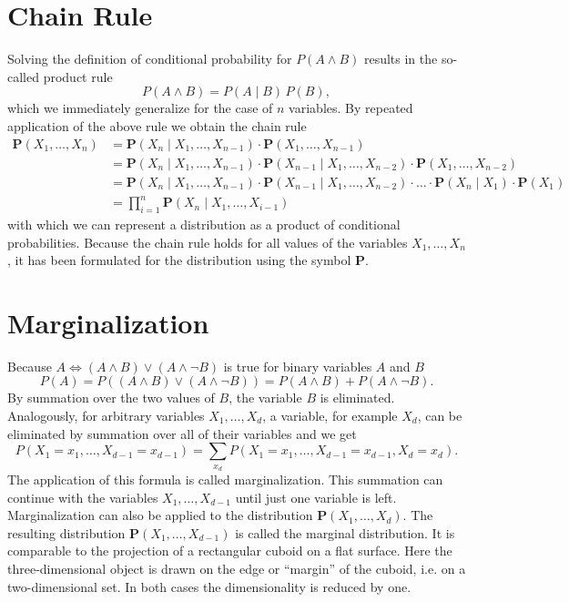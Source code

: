 \documentclass[10pt]{book}
\begin{document}
\section{Chain Rule}
Solving the definition of conditional probability for $P(A \wedge B)$ results in the so-called product rule
\[
P(A \wedge B)=P(A \mid B)\,P(B),
\]
which we immediately generalize for the case of $n$ variables. By repeated application of the above rule we obtain the chain rule
\begin{align*}
\boldsymbol{P}\left(X_{1}, \ldots, X_{n}\right)
&=\boldsymbol{P}\left(X_{n} \mid X_{1}, \ldots, X_{n-1}\right)\cdot \boldsymbol{P}\left(X_{1}, \ldots, X_{n-1}\right) \\
&=\boldsymbol{P}\left(X_{n} \mid X_{1}, \ldots, X_{n-1}\right)\cdot \boldsymbol{P}\left(X_{n-1} \mid X_{1}, \ldots, X_{n-2}\right)\cdot \boldsymbol{P}\left(X_{1}, \ldots, X_{n-2}\right) \\
&=\boldsymbol{P}\left(X_{n} \mid X_{1}, \ldots, X_{n-1}\right)\cdot \boldsymbol{P}\left(X_{n-1} \mid X_{1}, \ldots, X_{n-2}\right)\cdot \ldots \cdot \boldsymbol{P}\left(X_{n} \mid X_{1}\right)\cdot \boldsymbol{P}\left(X_{1}\right) \\
&=\prod_{i=1}^{n} \boldsymbol{P}\left(X_{n} \mid X_{1}, \ldots, X_{i-1}\right) \tag{7.1}
\end{align*}
with which we can represent a distribution as a product of conditional probabilities. Because the chain rule holds for all values of the variables $X_{1}, \ldots, X_{n}$, it has been formulated for the distribution using the symbol $\boldsymbol{P}$.

\section{Marginalization}
Because $A \Leftrightarrow(A \wedge B) \vee(A \wedge \neg B)$ is true for binary variables $A$ and $B$
\[
P(A)=P((A \wedge B) \vee(A \wedge \neg B))=P(A \wedge B)+P(A \wedge \neg B).
\]
By summation over the two values of $B$, the variable $B$ is eliminated. Analogously, for arbitrary variables $X_{1}, \ldots, X_{d}$, a variable, for example $X_{d}$, can be eliminated by summation over all of their variables and we get
\[
P\left(X_{1}=x_{1}, \ldots, X_{d-1}=x_{d-1}\right)=\sum_{x_{d}} P\left(X_{1}=x_{1}, \ldots, X_{d-1}=x_{d-1}, X_{d}=x_{d}\right).
\]
The application of this formula is called marginalization. This summation can continue with the variables $X_{1}, \ldots, X_{d-1}$ until just one variable is left. Marginalization can also be applied to the distribution $\boldsymbol{P}\left(X_{1}, \ldots, X_{d}\right)$. The resulting distribution $\boldsymbol{P}\left(X_{1}, \ldots, X_{d-1}\right)$ is called the marginal distribution. It is comparable to the projection of a rectangular cuboid on a flat surface. Here the three-dimensional object is drawn on the edge or “margin” of the cuboid, i.e. on a two-dimensional set. In both cases the dimensionality is reduced by one.
\end{document}
